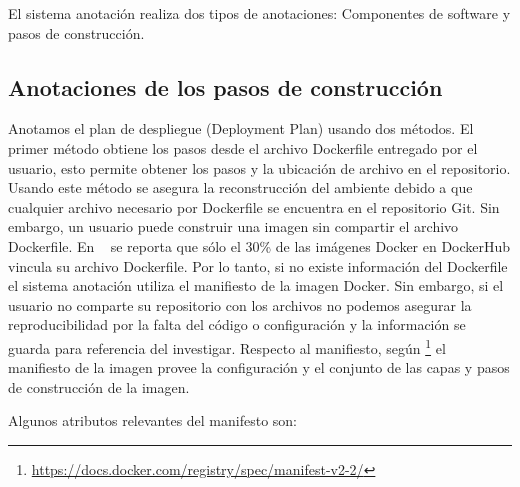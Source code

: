 El sistema anotación realiza dos tipos de anotaciones: Componentes de software y pasos de construcción.


\subsection{Anotaciones de los pasos de construcción}\label{s4.2.1}

Anotamos el plan de despliegue (Deployment Plan) usando dos métodos. El primer método obtiene los pasos desde el archivo Dockerfile entregado por el usuario, esto permite obtener los pasos y la ubicación de archivo en el repositorio. 
Usando este método se asegura la reconstrucción del ambiente debido a que cualquier archivo necesario por Dockerfile se encuentra en el repositorio Git.
Sin embargo, un usuario puede construir una imagen sin compartir el archivo Dockerfile. En ~\cite{DBLP:conf/semweb/OsorioAV18a} se reporta que sólo el 30\% de las imágenes Docker en DockerHub vincula su archivo Dockerfile. 
Por lo tanto, si no existe información del Dockerfile el sistema anotación utiliza el manifiesto de la imagen Docker. Sin embargo, si el usuario no comparte su repositorio con los archivos no podemos asegurar la reproducibilidad por la falta del código o configuración y la información se guarda para referencia del investigar.
Respecto al manifiesto,  según \footnote{\url{https://docs.docker.com/registry/spec/manifest-v2-2/}} el manifiesto de la imagen provee la configuración y el conjunto de las capas y pasos de construcción de la imagen.
 
 
Algunos atributos relevantes del manifesto son:

